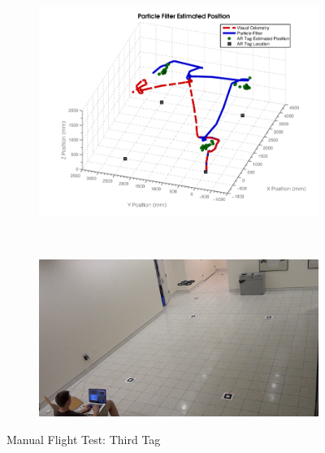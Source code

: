 	\begin{figure}[ht]
	        \centering
	        \begin{subfigure}[b]{0.75\textwidth}
	                \centering
	                \includegraphics[width=\textwidth]{../images/3dgraph_74.png}
	                \label{fig:tag3}
	        \end{subfigure}%
	        \\
	        \begin{subfigure}[b]{0.75\textwidth}
	                \centering
	                \includegraphics[width=\textwidth]{../images/frame3.png}
	                \label{fig:frame3}
	        \end{subfigure}
	        \caption{Manual Flight Test: Third Tag}
	\end{figure}

